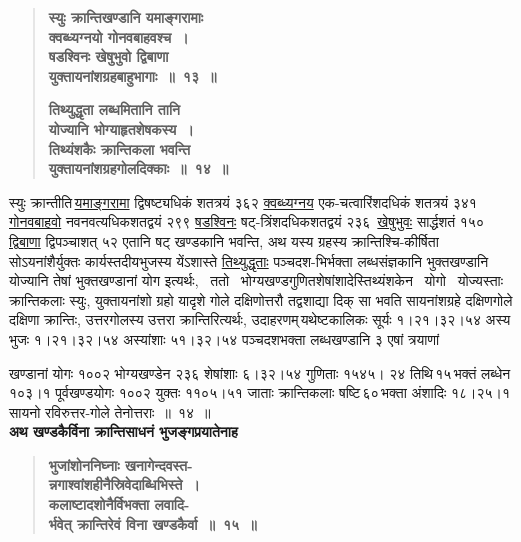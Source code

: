 \documentclass[11pt, openany]{book}
\begin{document}
 \label{3.13}
\begin{quote}
{\large \textbf{{\color{purple}स्युः क्रान्तिखण्डानि यमाङ्गरामाः\\ 
क्वब्ध्यग्नयो गोनवबाहवश्च~। \\
षडश्विनः खेषुभुवो द्विबाणा \\
युक्तायनांशग्रहबाहुभागाः~॥~१३~॥}}
\vspace{1mm}

 \label{3.14}
\textbf{{\color{purple}तिथ्युद्धृता लब्धमितानि तानि\\
योज्यानि भोग्याहृतशेषकस्य~। \\
तिथ्यंशकैः क्रान्तिकला भवन्ति\\
युक्तायनांशग्रहगोलदिक्काः~॥~१४~॥}}}
\end{quote}

स्युः क्रान्तीति\textendash \,\hyperref[3.13]{यमाङ्गरामा} द्विषष्ट्यधिकं शतत्रयं ३६२ \hyperref[3.13]{क्वब्ध्यग्नय} एक-चत्वारिंशदधिकं \;शतत्रयं \;३४१ \;\hyperref[3.13]{गोनवबाहवो} \;नवनवत्यधिकशतद्वयं \;२९९ \hyperref[3.13]{षडश्विनः} \;षट्-त्रिंशदधिकशतद्वयं \;२३६ \,\hyperref[3.13]{खेषुभुवः} \;सार्द्धशतं \;१५० \,\hyperref[3.13]{द्विबाणा} द्विपञ्चाशत् ५२ एतानि षट् खण्डकानि भवन्ति, अथ यस्य ग्रहस्य क्रान्तिश्चि-कीर्षिता सोऽयनांशैर्युक्तः कार्यस्तदीयभुजस्य येंऽशास्ते \hyperref[3.14]{तिथ्युद्धृताः} पञ्चदश-भिर्भक्ता \;लब्धसंज्ञकानि \;भुक्तखण्डानि \;योज्यानि \;तेषां \;भुक्तखण्डानां \;योग इत्यर्थः, ~ततो ~भोग्यखण्डगुणितशेषांशादेस्तिथ्यंशकेन ~योगो ~योज्यस्ताः क्रान्तिकलाः स्युः, युक्तायनांशो ग्रहो यादृशे गोले दक्षिणोत्तरौ तद्वशाद्या दिक् सा भवति सायनांशग्रहे दक्षिणगोले दक्षिणा क्रान्तिः, उत्तरगोलस्य उत्तरा क्रान्तिरित्यर्थः, उदाहरणम्\textendash \,यथेष्टकालिकः सूर्यः १।२१।३२।५४ अस्य भुजः १।२१।३२।५४ \;अस्यांशाः \;५१।३२।५४ \;पञ्चदशभक्ता \;लब्धखण्डानि \;३ \;एषां त्रयाणां

\newpage

\noindent खण्डानां योगः १००२ भोग्यखण्डेन २३६ शेषांशाः ६।३२।५४ गुणिताः १५४५। २४ तिथि\textendash \,१५\textendash \,भक्तं लब्धेन १०३।१ पूर्वखण्डयोगः १००२ युक्तः ११०५।५१ जाताः क्रान्तिकलाः षष्टि\textendash \,६०\textendash \,भक्ता अंशादिः १८।२५।१ सायनो रविरुत्तर-गोले तेनोत्तराः~॥~१४~॥\\

{\small \textbf{अथ खण्डकैर्विना क्रान्तिसाधनं भुजङ्गप्रयातेनाह \textendash }}

 \label{3.15}
\begin{quote}
{\large \textbf{{\color{purple}भुजांशोननिघ्नाः खनागेन्दवस्त-\\
न्नगाश्वांशहीनैस्रिवेदाब्धिभिस्ते~। \\
कलाष्टादशोनैर्विभक्ता लवादि-\\
र्भवेत् क्रान्तिरेवं विना खण्डकैर्वा~॥~१५~॥}}}
\end{quote}
\end{document}
